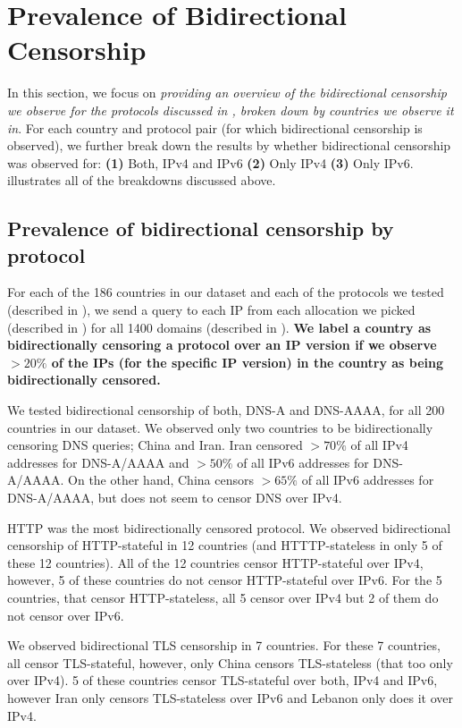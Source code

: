 \section{Prevalence of Bidirectional Censorship}
\PrevalenceGeneral
\label{sec:prevalence}
 In this section, we focus on \emph{providing an overview of the bidirectional censorship we observe for the protocols discussed in , broken down by countries we observe it in}.
For each country and protocol pair (for which bidirectional censorship is observed), we further break down the results by whether bidirectional censorship was observed for:
\textbf{(1)} Both, IPv4 and IPv6
\textbf{(2)} Only IPv4
\textbf{(3)} Only IPv6.
 illustrates all of the breakdowns discussed above.  

\subsection{Prevalence of bidirectional censorship by protocol}
\label{sec:prevalence:proto}
For each of the 186 countries in our dataset and each of the protocols we tested
(described in ), we send a query to each IP
from each allocation we picked (described in ) for
all 1400 domains (described in ). \textbf{We label
a country as bidirectionally censoring a protocol over an IP version if we
observe $> 20\%$ of the IPs (for the specific IP version) in the country as
being bidirectionally censored.}

We tested bidirectional censorship of both, DNS-A and DNS-AAAA, for all 200 countries in our dataset. We observed only two countries to be bidirectionally censoring DNS queries; China and Iran. Iran censored $>70\%$ of all IPv4 addresses for DNS-A/AAAA and $>50\%$ of all IPv6 addresses for DNS-A/AAAA. On the other hand, China censors $>65\%$ of all IPv6 addresses for DNS-A/AAAA, but does not seem to censor DNS over IPv4.  

HTTP was the most bidirectionally censored protocol. We observed bidirectional censorship of HTTP-stateful in 12 countries (and HTTTP-stateless in only 5 of these 12 countries). All of the 12 countries censor HTTP-stateful over IPv4, however, 5 of these countries do not censor HTTP-stateful over IPv6. For the 5 countries, that censor HTTP-stateless, all 5 censor over IPv4 but 2 of them do not censor over IPv6. 

We observed bidirectional TLS censorship in 7 countries. For these 7 countries, all censor TLS-stateful, however, only China censors TLS-stateless (that too only over IPv4). 5 of these countries censor TLS-stateful over both, IPv4 and IPv6, however Iran only censors TLS-stateless over IPv6 and Lebanon only does it over IPv4. 


